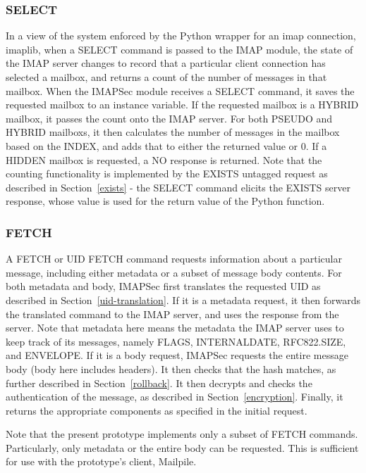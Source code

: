 \documentclass[pageno]{jpaper}
\newcommand{\project}{IMAPSec }
\begin{document}
\subsubsection{SELECT} In a view of the system enforced by the Python wrapper for an imap connection, imaplib, when a SELECT command is passed to the IMAP module, the state of the IMAP server changes to record that a particular client connection has selected a mailbox, and returns a count of the number of messages in that mailbox. When the \project module receives a SELECT command, it saves the requested mailbox to an instance variable. If the requested mailbox is a HYBRID mailbox, it passes the count onto the IMAP server. For both PSEUDO and HYBRID mailboxs, it then calculates the number of messages in the mailbox based on the INDEX, and adds that to either the returned value or 0. If a HIDDEN mailbox is requested, a NO response is returned. Note that the counting functionality is implemented by the EXISTS untagged request as described in Section~\ref{exists} - the SELECT command elicits the EXISTS server response, whose value is used for the return value of the Python function.

\subsubsection{FETCH} A FETCH or UID FETCH command requests information about a particular message, including either metadata or a subset of message body contents. For both metadata and body, \project first translates the requested UID as described in Section~\ref{uid-translation}. If it is a metadata request, it then forwards the translated command to the IMAP server, and uses the response from the server. Note that metadata here means the metadata the IMAP server uses to keep track of its messages, namely FLAGS, INTERNALDATE, RFC822.SIZE, and ENVELOPE. If it is a body request, \project requests the entire message body (body here includes headers). It then checks that the hash matches, as further described in Section~\ref{rollback}. It then decrypts and checks the authentication of the message, as described in Section~\ref{encryption}. Finally, it returns the appropriate components as specified in the initial request.


Note that the present prototype implements only a subset of FETCH commands. Particularly, only metadata or the entire body can be requested. This is sufficient for use with the prototype's client, Mailpile.
\end{document}
